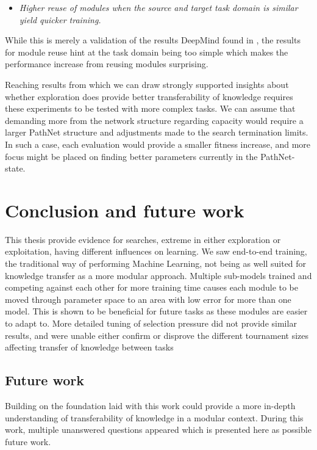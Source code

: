 \begin{itemize}
    \item \emph{Higher reuse of modules when the source and target task domain is similar yield quicker training.}
\end{itemize}
While this is merely a validation of the results DeepMind found in \cite{pathnet}, the results for module reuse hint at the task domain being too simple which makes the performance increase from reusing modules surprising. 

Reaching results from which we can draw strongly supported insights about whether exploration does provide better transferability of knowledge requires these experiments to be tested with more complex tasks. We can assume that demanding more from the network structure regarding capacity would require a larger PathNet structure and adjustments made to the search termination limits. In such a case, each evaluation would provide a smaller fitness increase, and more focus might be placed on finding better parameters currently in the PathNet-state. 

\section{Conclusion and future work}
This thesis provide evidence for searches, extreme in either exploration or exploitation, having different influences on learning. We saw end-to-end training, the traditional way of performing Machine Learning, not being as well suited for knowledge transfer as a more modular approach. Multiple sub-models trained and competing against each other for more training time causes each module to be moved through parameter space to an area with low error for more than one model. This is shown to be beneficial for future tasks as these modules are easier to adapt to. More detailed tuning of selection pressure did not provide similar results, and were unable either confirm or disprove the different tournament sizes affecting transfer of knowledge between tasks

\subsection{Future work}
Building on the foundation laid with this work could provide a more in-depth understanding of transferability of knowledge in a modular context. During this work, multiple unanswered questions appeared which is presented here as possible future work. 

